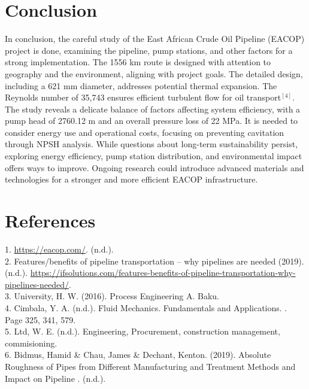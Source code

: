 \documentclass[12pt]{article}
\begin{document}
      \section{Conclusion}

      In conclusion, the careful study of the East African Crude Oil Pipeline (EACOP) project is done, examining the pipeline, pump stations, and other factors for a strong implementation. The 1556 km route is designed with attention to geography and the environment, aligning with project goals. The detailed design, including a 621 mm diameter, addresses potential thermal expansion. The Reynolds number of 35,743 ensures efficient turbulent flow for oil transport$^{[4]}$. The study reveals a delicate balance of factors affecting system efficiency, with a pump head of 2760.12 m and an overall pressure loss of 22 MPa. It is needed to consider energy use and operational costs, focusing on preventing cavitation through NPSH analysis. While questions about long-term sustainability persist, exploring energy efficiency, pump station distribution, and environmental impact offers ways to improve. Ongoing research could introduce advanced materials and technologies for a stronger and more efficient EACOP infrastructure.
      
      \section{References}
      \textbf{} 

      1. \url{https://eacop.com/}. (n.d.). \\

      2. Features/benefits of pipeline transportation – why pipelines are needed (2019). (n.d.). \url{https://ifsolutions.com/features-benefits-of-pipeline-transportation-why-pipelines-needed/}. \\

      3. University, H. W. (2016). Process Engineering A. Baku. \\

      4. Cimbala, Y. A. (n.d.). Fluid Mechanics. Fundamentals and Applications. . Page 325, 341, 579. \\

      5. Ltd, W. E. (n.d.). Engineering, Procurement, construction management, commisioning. \\

      6. Bidmus, Hamid \& Chau, James \& Dechant, Kenton. (2019). Absolute Roughness of Pipes from Different Manufacturing and Treatment Methods and Impact on Pipeline . (n.d.).
\end{document}
